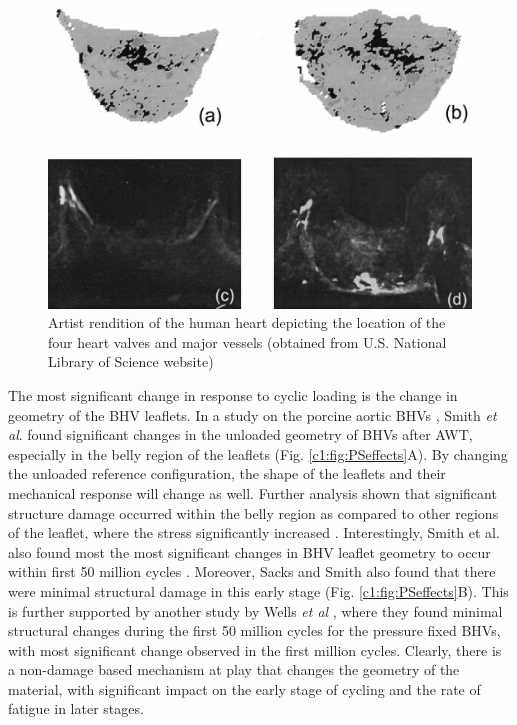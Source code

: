 \begin{figure}
\centering
\includegraphics[width=5.0in]{Images/chapter1/calcificationdamage.jpg}
\caption{Artist rendition of the human heart depicting the location of the four heart valves and major vessels (obtained from U.S. National Library of Science website)}
\label{c1:fig:calcificationdamage}
\end{figure}

    The most significant change in response to cyclic loading is the change in geometry of the BHV leaflets. In a study on the porcine aortic BHVs \cite{smith_high_1997},  Smith \textit{et al}. found significant changes in the unloaded geometry of BHVs after AWT, especially in the belly region of the leaflets (Fig. \ref{c1:fig:PSeffects}A). By changing the unloaded reference configuration, the shape of the leaflets and their mechanical response will change as well. Further analysis shown that significant structure damage occurred within the belly region as compared to other regions of the leaflet, where the stress significantly increased \cite{smith_fatigue_1999}. Interestingly, Smith et al. also found most the most significant changes in BHV leaflet geometry to occur within first 50 million cycles \cite{smith_high_1997}. Moreover, Sacks and Smith \cite{sacks_effects_1998} also found that there were minimal structural damage in this early stage (Fig. \ref{c1:fig:PSeffects}B). This is further supported by another study by Wells \textit{et al} \cite{wells_cyclic_2005}, where they found minimal structural changes during the first 50 million cycles for the pressure fixed BHVs, with most significant change observed in the first million cycles. Clearly, there is a non-damage based mechanism at play that changes the geometry of the material, with significant impact on the early stage of cycling and the rate of fatigue in later stages. 


